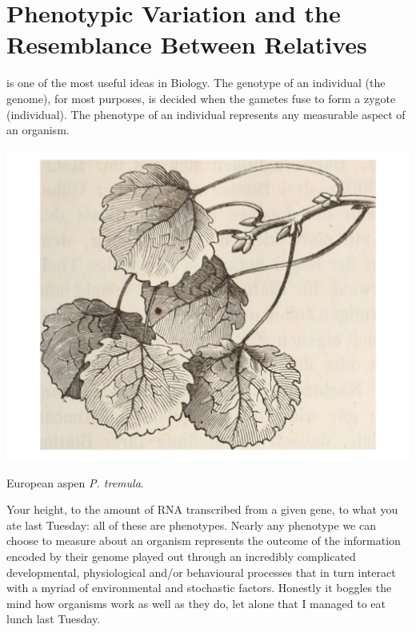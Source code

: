 \chapter{Phenotypic Variation and the Resemblance Between Relatives}

 is one of the most useful ideas in Biology.\cite{Johannsen:1911} 
The genotype of an individual (the genome), for most purposes, is decided when
the gametes fuse to form a zygote (individual). The phenotype of an individual represents any
measurable aspect of an organism. \begin{marginfigure}
\begin{center}
\includegraphics[width=0.8 \textwidth]{illustration_images/Quant_gen/Aspen_budset/Aspen_leaves.pdf}
\end{center}
\caption{European aspen {\it P. tremula}.  } \label{fig:Apsen}
\end{marginfigure}   Your height, to the amount of
RNA transcribed from a given gene, to what you ate last Tuesday: all
of these are phenotypes.  Nearly any phenotype we can choose to measure about an organism represents the outcome of the information encoded by their genome played out through an incredibly complicated
developmental, physiological and/or behavioural processes that in turn interact with a myriad of environmental and
stochastic factors. Honestly it boggles the mind how organisms work as well as they do, let alone that I managed to eat lunch last Tuesday. 

